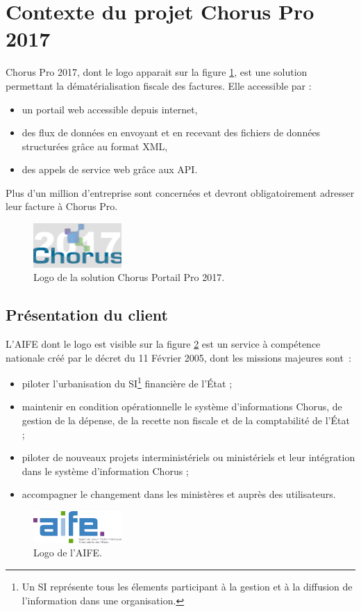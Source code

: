 \documentclass[12pt,a4paper]{article}
\begin{document}
\section{Contexte du projet Chorus Pro 2017}
Chorus Pro 2017, dont le logo apparait sur la figure \ref{logoCpp}, est une solution  permettant la dématérialisation fiscale des factures. Elle accessible par :
\begin{itemize}
\item un portail web accessible depuis internet,
\item des flux de données en envoyant et en recevant des fichiers de données structurées grâce au format \gls{XML},
\item des appels de service web grâce aux \gls{API}.
\end{itemize}
Plus d'un million d'entreprise sont concernées et devront obligatoirement adresser leur facture à Chorus Pro.
\begin{figure}[H]
	\begin{center}
		\includegraphics[width=0.3\textwidth, height=\textheight, keepaspectratio]{cpp2017.png}
		\caption{Logo de la solution Chorus Portail Pro 2017.}
		\label{logoCpp}
	\end{center}
\end{figure}
\subsection{Présentation du client}
L'AIFE dont le logo est visible sur la figure \ref{logoAife} est un service à compétence nationale créé par le décret du 11 Février 2005, dont les missions majeures sont~:
\begin{itemize}
\item piloter l’urbanisation du \gls{SI}\footnote{Un SI représente tous les élements participant à la gestion et à la diffusion de l'information dans une organisation.} financière de l’État ;
\item maintenir en condition opérationnelle le système d’informations Chorus, de gestion de la dépense, de la recette non fiscale et de la comptabilité de l’État ;
\item piloter de nouveaux projets interministériels ou ministériels et leur intégration dans le système d’information Chorus ;
\item accompagner le changement dans les ministères et auprès des utilisateurs.
\end{itemize}
\begin{figure}[H]
\begin{center}
\includegraphics[width=0.3\textwidth, height=\textheight, keepaspectratio]{aifedef.png}
\caption{Logo de l'AIFE.}
\label{logoAife}
\end{center}
\end{figure}
\newpage
\end{document}
